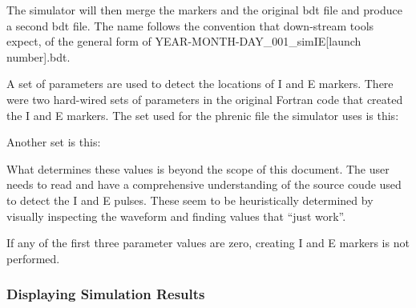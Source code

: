 \documentclass[12pt,openany,oneside]{book}
\begin{document}
The simulator will then merge the markers and the original bdt file and
produce a second bdt file. The name follows the convention that
down-stream tools expect, of the general form of
YEAR-MONTH-DAY\_001\_simIE[launch number].bdt. 

A set of parameters are used to detect the locations of I and E markers.
There were two hard-wired sets of parameters in the original Fortran code
that created the I and E markers.  The set used for the phrenic file 
the simulator uses is this:
\bigskip

\bigskip


Another set is this:


\bigskip

\bigskip

What determines these values is beyond the scope of this document. The
user needs to read and have a comprehensive understanding of the source
coude used to detect the I and E pulses. These seem to be heuristically
determined by visually inspecting the waveform and finding values that
``just work''.

If any of the first three parameter values are zero, creating I and E
markers is not performed.

\subsubsection{Displaying Simulation Results}
\end{document}
